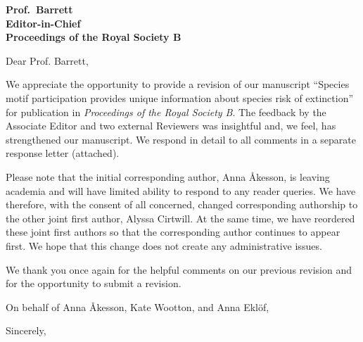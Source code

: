\documentclass[12pt]{letter}
\begin{document}
\begin{letter}{\bf
Prof.~Barrett\\
Editor-in-Chief\\
Proceedings of the Royal Society B} %


\opening{Dear Prof. Barrett,}

We appreciate the opportunity to provide a revision of our manuscript ``Species motif participation provides unique information about species risk of extinction'' for publication in \emph{Proceedings of the Royal Society B}. 
The feedback by the Associate Editor and two external Reviewers was insightful and, we feel, has strengthened our manuscript.
We respond in detail to all comments in a separate response letter (attached).


Please note that the initial corresponding author, Anna \r{A}kesson, is leaving academia and will have limited ability to respond to any reader queries.
We have therefore, with the consent of all concerned, changed corresponding authorship to the other joint first author, Alyssa Cirtwill.
At the same time, we have reordered these joint first authors so that the corresponding author continues to appear first.
We hope that this change does not create any administrative issues.


We thank you once again for the helpful comments on our previous revision and for the opportunity to submit a revision.

On behalf of Anna {\AA}kesson, Kate Wootton, and Anna Ekl\"of,

\closing{Sincerely,}


\end{letter} 
\end{document}
